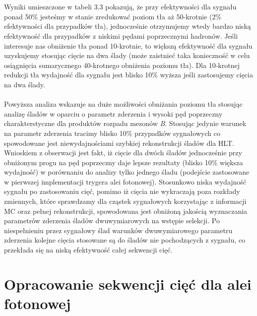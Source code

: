 \documentclass{pracamgr}
\begin{document}
\\\\
\noindent
Wyniki umieszczone w tabeli 3.3 pokazują, że przy efektywności dla sygnału ponad 50\% jesteśmy w stanie zredukować poziom tła aż 50-krotnie (2\% efektywności dla przypadków tła), jednocześnie otrzymujemy wtedy bardzo niską efektywność dla przypadków z niskimi pędami poprzecznymi hadronów. Jeśli interesuje nas obniżenie tła ponad 10-krotnie, to większą efektywność dla sygnału uzyskujemy stosując cięcie na dwa ślady (może zaistnieć taka konieczność w celu osiągnięcia sumarycznego 40-krotnego obniżenia poziomu tła). Dla 10-krotnej redukcji tła wydajność dla sygnału jest blisko 10\% wyższa jeśli zastosujemy cięcia na dwa ślady. 
\\\\
\noindent
Powyższa analiza wskazuje na duże możliwości obniżania poziomu tła stosując analizę śladów w oparciu o parametr zderzenia i wysoki pęd poprzeczny charakterstyczne dla produktów rozpadu mezonów \textit{B}. Stosując jedynie warunek na parametr zderzenia tracimy blisko 10\% przypadków sygnałowych co spowodowane jest niewydajnościami szybkiej rekonstrukcji śladów dla HLT. Wnioskiem z obserwacji jest fakt, iż cięcie dla dwóch śladów jednocześnie przy obniżonym progu na pęd poprzeczny daje lepsze rezultaty (blisko 10\% większa wydajność) w porównaniu do analizy tylko jednego śladu (podejście zastosowane w pierwszej implementacji trygera alei fotonowej). Stosunkowo niska wydajność sygnału po zastosowaniu cięć, pomimo iż cięcia nie wykraczają poza rozkłady zmiennych, które sprawdzamy dla cząstek sygnałowych korzystając z informacji MC oraz pełnej rekonstrukcji, spowodowana jest obniżoną jakością wyznaczania parametrów zderzenia śladów dwuwymiarowych na wstępie selekcji. Po niespełnieniu przez sygnałowy ślad warunków dwuwymiarowego parametru zderzenia kolejne cięcia stosowane są do śladów nie pochodzących z sygnału, co przekłada się na niską efektywność całej sekwencji cięć.

\section{Opracowanie sekwencji cięć dla alei fotonowej}
\end{document}
